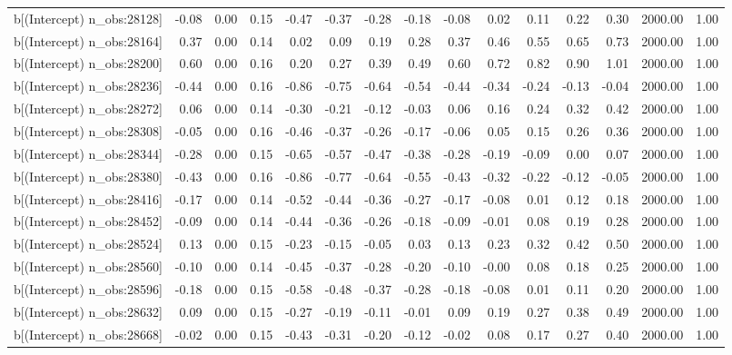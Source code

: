 \begin{table}[ht]
\begin{tabular}{rrrrrrrrrrrrrrr}
  b[(Intercept) n\_obs:28128] & -0.08 & 0.00 & 0.15 & -0.47 & -0.37 & -0.28 & -0.18 & -0.08 & 0.02 & 0.11 & 0.22 & 0.30 & 2000.00 & 1.00 \\ 
  b[(Intercept) n\_obs:28164] & 0.37 & 0.00 & 0.14 & 0.02 & 0.09 & 0.19 & 0.28 & 0.37 & 0.46 & 0.55 & 0.65 & 0.73 & 2000.00 & 1.00 \\ 
  b[(Intercept) n\_obs:28200] & 0.60 & 0.00 & 0.16 & 0.20 & 0.27 & 0.39 & 0.49 & 0.60 & 0.72 & 0.82 & 0.90 & 1.01 & 2000.00 & 1.00 \\ 
  b[(Intercept) n\_obs:28236] & -0.44 & 0.00 & 0.16 & -0.86 & -0.75 & -0.64 & -0.54 & -0.44 & -0.34 & -0.24 & -0.13 & -0.04 & 2000.00 & 1.00 \\ 
  b[(Intercept) n\_obs:28272] & 0.06 & 0.00 & 0.14 & -0.30 & -0.21 & -0.12 & -0.03 & 0.06 & 0.16 & 0.24 & 0.32 & 0.42 & 2000.00 & 1.00 \\ 
  b[(Intercept) n\_obs:28308] & -0.05 & 0.00 & 0.16 & -0.46 & -0.37 & -0.26 & -0.17 & -0.06 & 0.05 & 0.15 & 0.26 & 0.36 & 2000.00 & 1.00 \\ 
  b[(Intercept) n\_obs:28344] & -0.28 & 0.00 & 0.15 & -0.65 & -0.57 & -0.47 & -0.38 & -0.28 & -0.19 & -0.09 & 0.00 & 0.07 & 2000.00 & 1.00 \\ 
  b[(Intercept) n\_obs:28380] & -0.43 & 0.00 & 0.16 & -0.86 & -0.77 & -0.64 & -0.55 & -0.43 & -0.32 & -0.22 & -0.12 & -0.05 & 2000.00 & 1.00 \\ 
  b[(Intercept) n\_obs:28416] & -0.17 & 0.00 & 0.14 & -0.52 & -0.44 & -0.36 & -0.27 & -0.17 & -0.08 & 0.01 & 0.12 & 0.18 & 2000.00 & 1.00 \\ 
  b[(Intercept) n\_obs:28452] & -0.09 & 0.00 & 0.14 & -0.44 & -0.36 & -0.26 & -0.18 & -0.09 & -0.01 & 0.08 & 0.19 & 0.28 & 2000.00 & 1.00 \\ 
  b[(Intercept) n\_obs:28524] & 0.13 & 0.00 & 0.15 & -0.23 & -0.15 & -0.05 & 0.03 & 0.13 & 0.23 & 0.32 & 0.42 & 0.50 & 2000.00 & 1.00 \\ 
  b[(Intercept) n\_obs:28560] & -0.10 & 0.00 & 0.14 & -0.45 & -0.37 & -0.28 & -0.20 & -0.10 & -0.00 & 0.08 & 0.18 & 0.25 & 2000.00 & 1.00 \\ 
  b[(Intercept) n\_obs:28596] & -0.18 & 0.00 & 0.15 & -0.58 & -0.48 & -0.37 & -0.28 & -0.18 & -0.08 & 0.01 & 0.11 & 0.20 & 2000.00 & 1.00 \\ 
  b[(Intercept) n\_obs:28632] & 0.09 & 0.00 & 0.15 & -0.27 & -0.19 & -0.11 & -0.01 & 0.09 & 0.19 & 0.27 & 0.38 & 0.49 & 2000.00 & 1.00 \\ 
  b[(Intercept) n\_obs:28668] & -0.02 & 0.00 & 0.15 & -0.43 & -0.31 & -0.20 & -0.12 & -0.02 & 0.08 & 0.17 & 0.27 & 0.40 & 2000.00 & 1.00 \\ 

\end{tabular}
\end{table}
